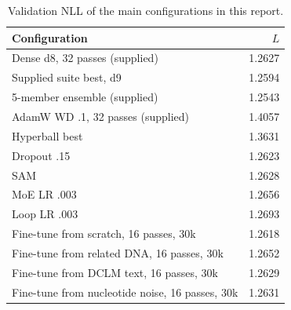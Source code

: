 \begin{table}[H]\centering\small\caption{Validation NLL of the main configurations in this report.}\label{tab:ref}
\begin{tabular}{lr}\toprule Configuration & $L$ \\ \midrule
Dense d8, 32 passes (supplied) & 1.2627 \\
Supplied suite best, d9 & 1.2594 \\
5-member ensemble (supplied) & 1.2543 \\
AdamW WD .1, 32 passes (supplied) & 1.4057 \\
Hyperball best & 1.3631 \\
Dropout .15 & 1.2623 \\
SAM & 1.2628 \\
MoE LR .003 & 1.2656 \\
Loop LR .003 & 1.2693 \\
Fine-tune from scratch, 16 passes, 30k & 1.2618 \\
Fine-tune from related DNA, 16 passes, 30k & 1.2652 \\
Fine-tune from DCLM text, 16 passes, 30k & 1.2629 \\
Fine-tune from nucleotide noise, 16 passes, 30k & 1.2631 \\
\bottomrule\end{tabular}\end{table}
